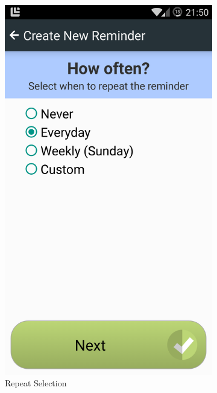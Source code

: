 \begin{figure}[h]
\begin{subfigure}[t]{0.3\textwidth}
        \centering
        \includegraphics[width=\textwidth]{Files/treatment-study-1/figures/app-remindercreate-type}
        \caption{Repeat Selection}
        \label{fig: remindercreate-repeat}
    \end{subfigure}
    \hfill
	\begin{subfigure}[t]{0.3\textwidth}
        \centering

\end{subfigure}
\end{figure}
